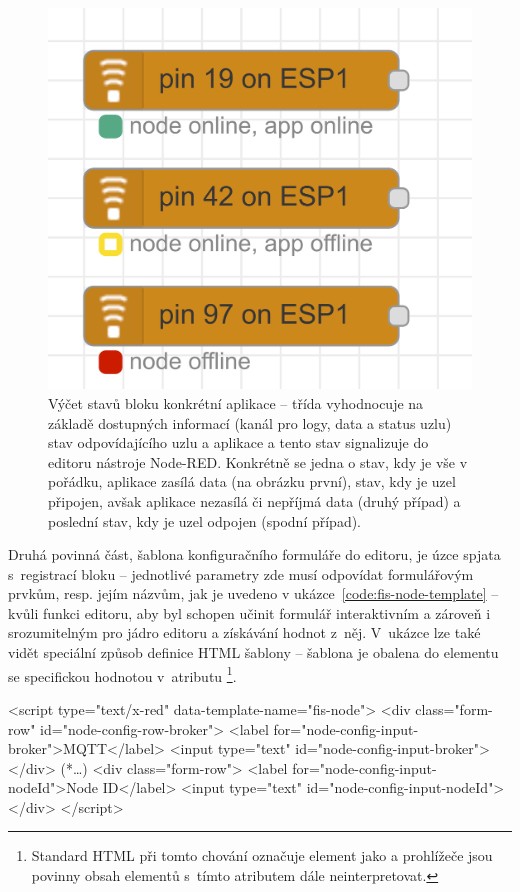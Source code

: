 \begin{figure}
    \centering
    \includegraphics[width=.5\textwidth]{figures/fis-node-status.png}
    \caption{Výčet stavů bloku konkrétní aplikace -- třída  vyhodnocuje na základě dostupných informací
    (kanál pro logy, data a status uzlu) stav odpovídajícího uzlu a aplikace a tento stav signalizuje do editoru
    nástroje Node-RED. Konkrétně se jedna o stav, kdy je vše v pořádku, aplikace zasílá data (na obrázku první),
    stav, kdy je uzel připojen, avšak aplikace nezasílá či nepříjmá data (druhý případ) a poslední stav,
    kdy je uzel odpojen (spodní případ).}
    \label{fig:fis-node-status}
\end{figure}

Druhá povinná část, šablona konfiguračního formuláře do editoru, je úzce spjata s~registrací bloku -- jednotlivé
parametry zde musí odpovídat formulářovým prvkům, resp. jejím názvům, jak je uvedeno v
ukázce~\ref{code:fis-node-template} -- kvůli funkci editoru, aby byl schopen učinit
formulář interaktivním a zároveň i srozumitelným pro jádro editoru a získávání hodnot z~něj.
V~ukázce lze také vidět speciální způsob definice HTML šablony -- šablona je obalena do elementu  se
specifickou hodnotou v~atributu \footnote{Standard HTML při tomto chování označuje
element  jako  a prohlížeče jsou povinny obsah elementů s~tímto atributem dále
neinterpretovat.}.

\begin{code}[
    language=HTML,
    label=code:fis-node-template,
    caption={Ukázka z~implementace druhé povinné části deklarace bloku -- šablona formuláře v~jazyce HTML obsahuje
    jednotlivé vstupní pro pole pro korespondující parametry definovené v~registraci bloku do editoru
    v~ukázce~\ref{code:fis-node-constructor}.
    Atribut \ic{id="node-config-input-broker"} (a odpovídající) jsou důležité vzhledem k~chování editoru, nutná je shoda
    s~názvem parametru při registraci bloku -- stejně jako správné spárování šablony pomocí atributu
    \ic{data-template-name="fis-node"}.},
]
<script type="text/x-red" data-template-name="fis-node">
    <div class="form-row" id="node-config-row-broker">
        <label for="node-config-input-broker">MQTT</label>
        <input type="text" id="node-config-input-broker">
    </div>
    (*\ldots*)
    <div class="form-row">
        <label for="node-config-input-nodeId">Node ID</label>
        <input type="text" id="node-config-input-nodeId">
    </div>
</script>
\end{code}


